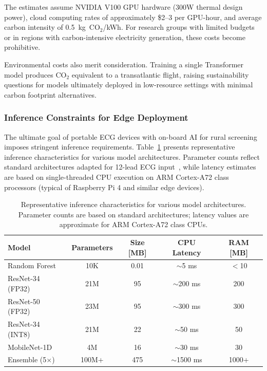 The estimates assume NVIDIA V100 GPU hardware (300W thermal design power), cloud computing rates of approximately \$2--3 per GPU-hour, and average carbon intensity of 0.5~kg~CO$_2$/kWh. For research groups with limited budgets or in regions with carbon-intensive electricity generation, these costs become prohibitive.

Environmental costs also merit consideration. Training a single Transformer model produces CO$_2$ equivalent to a transatlantic flight, raising sustainability questions for models ultimately deployed in low-resource settings with minimal carbon footprint alternatives.

\subsubsection{Inference Constraints for Edge Deployment}

The ultimate goal of portable ECG devices with on-board AI for rural screening imposes stringent inference requirements. Table~\ref{tab:inference_costs} presents representative inference characteristics for various model architectures. Parameter counts reflect standard architectures adapted for 12-lead ECG input~\cite{he2016deep,ribeiro2020automatic}, while latency estimates are based on single-threaded CPU execution on ARM Cortex-A72 class processors (typical of Raspberry Pi 4 and similar edge devices).

\begin{table}[h]
\centering
\caption[Representative inference characteristics for various model architectures]{Representative inference characteristics for various model architectures. Parameter counts are based on standard architectures; latency values are approximate for ARM Cortex-A72 class CPUs.}
\label{tab:inference_costs}
\begin{tabular}{lcccc}
\hline
\textbf{Model} & \textbf{Parameters} & \textbf{Size [MB]} & \textbf{CPU Latency} & \textbf{RAM [MB]} \\
\hline
Random Forest & 10K & 0.01 & $\sim$5 ms & $<$10 \\
ResNet-34 (FP32) & 21M & 95 & $\sim$200 ms & 200 \\
ResNet-50 (FP32) & 23M & 95 & $\sim$300 ms & 300 \\
ResNet-34 (INT8) & 21M & 22 & $\sim$50 ms & 50 \\
MobileNet-1D & 4M & 16 & $\sim$30 ms & 30 \\
Ensemble (5$\times$) & 100M+ & 475 & $\sim$1500 ms & 1000+ \\
\hline
\end{tabular}
\end{table}

